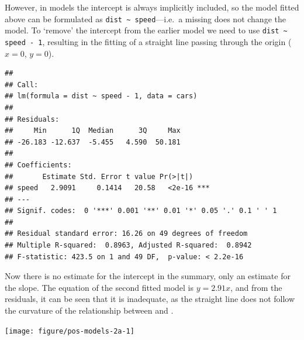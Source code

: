 \documentclass[krantz2]{krantz}\usepackage{knitr}%
\begin{document}
However, in \Rlang models the intercept is always implicitly included, so the model fitted above can be formulated as \verb|dist ~ speed|---i.e.\ a missing  does not change the model. To `remove' the intercept from the earlier model we need to use \verb|dist ~ speed - 1|, resulting in the fitting of a straight line passing through the origin ($x = 0$, $y = 0$).

\begin{knitrout}\footnotesize
{}\color{fgcolor}\begin{kframe}
\begin{alltt}
 \hlkwb{<-}  \hlopt{~}  \hlopt{-} \hlstd{,} 
\end{alltt}
\begin{verbatim}
## 
## Call:
## lm(formula = dist ~ speed - 1, data = cars)
## 
## Residuals:
##     Min      1Q  Median      3Q     Max 
## -26.183 -12.637  -5.455   4.590  50.181 
## 
## Coefficients:
##       Estimate Std. Error t value Pr(>|t|)    
## speed   2.9091     0.1414   20.58   <2e-16 ***
## ---
## Signif. codes:  0 '***' 0.001 '**' 0.01 '*' 0.05 '.' 0.1 ' ' 1
## 
## Residual standard error: 16.26 on 49 degrees of freedom
## Multiple R-squared:  0.8963,	Adjusted R-squared:  0.8942 
## F-statistic: 423.5 on 1 and 49 DF,  p-value: < 2.2e-16
\end{verbatim}
\end{kframe}
\end{knitrout}

Now there is no estimate for the intercept in the summary, only an estimate for the slope. The equation of the second fitted model is $y = 2.91 x$, and from the residuals, it can be seen that it is inadequate, as the straight line does not follow the curvature of the relationship between  and .

\begin{knitrout}\footnotesize
{}\color{fgcolor}\begin{kframe}
\begin{alltt}
  \hlstd{=} \hlstd{)}
\end{alltt}
\end{kframe}

{\centering \texttt{[image: figure/pos-models-2a-1]} 

}



\end{knitrout}
\end{document}
